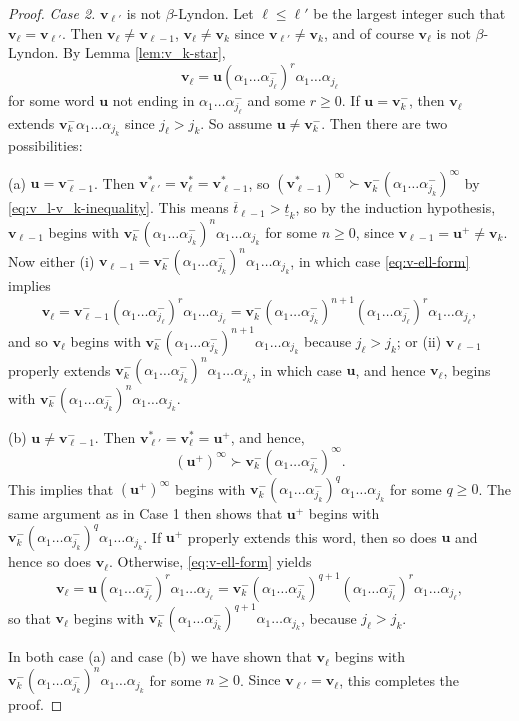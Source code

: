 \documentclass[10pt,a4paper]{amsart}
\newcommand{\al}{\alpha}
\newcommand{\f}{\infty}
\renewcommand{\u}{\mathbf{u}}
\renewcommand{\v}{\mathbf{v}}
\begin{document}
\begin{proof}
\medskip
{\em Case 2.} $\v_{\ell'}$ is not $\beta$-Lyndon. Let $\ell\leq \ell'$ be the largest integer such that $\v_{\ell}=\v_{\ell'}$.
Then $\v_{\ell}\neq \v_{\ell-1}$, $\v_{\ell}\neq \v_k$ since $\v_{\ell'}\neq \v_k$, and of course $\v_{\ell}$ is not $\beta$-Lyndon. By Lemma \ref{lem:v_k-star},
\begin{equation} \label{eq:v-ell-form}
\v_{\ell}=\u(\al_1\dots\al_{j_{\ell}}^-)^r\al_1\dots\al_{j_{\ell}}
\end{equation}
for some word $\u$ not ending in $\al_1\dots\al_{j_{\ell}}^-$ and some $r\geq 0$. If $\u=\v_k^-$, then $\v_\ell$ extends $\v_k^-\al_1\dots\al_{j_k}$ {since $j_\ell>j_k$}. So assume $\u\neq\v_k^-$. Then there are two possibilities:

(a) $\u=\v_{\ell-1}^-$. Then $\v_{\ell'}^*=\v_\ell^*=\v_{\ell-1}^*$, so $(\v_{\ell-1}^*)^\f \succ \v_k^-(\al_1\dots\al_{j_k}^-)^\f$ by \eqref{eq:v_l-v_k-inequality}. This means $\overline{t}_{\ell-1}>\underline{t}_k$, so by the induction hypothesis, $\v_{\ell-1}$ begins with $\v_k^-(\al_1\dots\al_{j_k}^-)^n\al_1\dots\al_{j_k}$ for some $n\geq 0$, since $\v_{\ell-1}=\u^+\neq \v_k$. Now either (i) $\v_{\ell-1}=\v_k^-(\al_1\dots\al_{j_k}^-)^n\al_1\dots\al_{j_k}$, in which case {\eqref{eq:v-ell-form} implies}
\[
\v_\ell=\v_{\ell-1}^-(\al_1\dots\al_{j_{\ell}}^-)^r\al_1\dots\al_{j_{\ell}}=\v_k^-(\al_1\dots\al_{j_k}^-)^{n+1}(\al_1\dots\al_{j_{\ell}}^-)^r\al_1\dots\al_{j_{\ell}},
\]
and so $\v_\ell$ begins with $\v_k^-(\al_1\dots\al_{j_k}^-)^{n+1}\al_1\dots\al_{j_k}$ because $j_\ell>j_k$; or (ii) $\v_{\ell-1}$ properly extends $\v_k^-(\al_1\dots\al_{j_k}^-)^n\al_1\dots\al_{j_k}$, in which case $\u$, and hence $\v_\ell$, begins with ${\v_k^-}(\al_1\dots\al_{j_k}^-)^n\al_1\dots\al_{j_k}$.

(b) $\u\neq\v_{\ell-1}^-$. Then $\v_{\ell'}^*=\v_\ell^*=\u^+$, and hence,
\[
(\u^+)^\f\succ \v_k^-(\al_1\dots\al_{j_k}^-)^\f.
\]
This implies that $(\u^+)^\f$ begins with $\v_k^-(\al_1\dots\al_{j_k}^-)^{q}\al_1\dots\al_{j_k}$ for some ${q}\geq 0$. The same argument as in Case 1 then shows that $\u^+$ {begins with} $\v_k^-(\al_1\dots\al_{j_k}^-)^{q}\al_1\dots\al_{j_k}$. If $\u^+$ properly extends this word, then so does $\u$ and hence so does $\v_\ell$.
Otherwise, {\eqref{eq:v-ell-form} yields
\[
\v_\ell=\u(\al_1\dots\al_{j_{\ell}}^-)^r\al_1\dots\al_{j_\ell}=\v_k^-(\al_1\dots\al_{j_k}^-)^{q+1}(\al_1\dots\al_{j_{\ell}}^-)^r\al_1\dots\al_{j_\ell},
\]
}
so that $\v_\ell$ {begins with} $\v_k^-(\al_1\dots\al_{j_k}^-)^{{q}+1}\al_1\dots\al_{j_k}$, because $j_\ell>j_k$.

In both case (a) and case (b) we have shown that $\v_\ell$ {begins with} $\v_k^-(\al_1\dots\al_{j_k}^-)^n\al_1\dots\al_{j_k}$ for some $n\geq 0$. {Since $\v_{\ell'}=\v_\ell$}, this completes the proof.
\end{proof}
\end{document}
